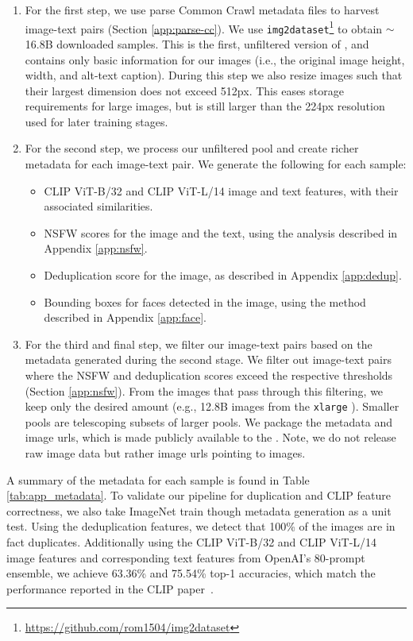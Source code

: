 \begin{enumerate}
    \item For the first step, we use parse Common Crawl metadata files to harvest image-text pairs (Section \ref{app:parse-cc}). We use \texttt{img2dataset}\footnote{\url{https://github.com/rom1504/img2dataset}} to obtain $\sim$16.8B downloaded samples. This is the first, unfiltered version of \pool, and contains only basic information for our images (i.e., the original image height, width, and alt-text caption). During this step we also resize images such that their largest dimension does not exceed 512px.
    This eases storage requirements for large images, but is still larger than the 224px resolution used for later training stages.
    
    \item For the second step, we process our unfiltered pool and create richer metadata for each image-text pair. We generate the following for each sample:
    \begin{itemize}
        \item CLIP ViT-B/32 and CLIP ViT-L/14 image and text features, with their associated similarities.
        \item NSFW scores for the image and the text, using the analysis described in Appendix \ref{app:nsfw}.
        \item Deduplication score for the image, as described in Appendix \ref{app:dedup}.
        \item Bounding boxes for faces detected in the image, using the method described in Appendix \ref{app:face}.
    \end{itemize}

    \item For the third and final step, we filter our image-text pairs based on the metadata generated during the second stage. We filter out image-text pairs where the NSFW and deduplication scores exceed the respective thresholds (Section \ref{app:nsfw}). From the images that pass through this filtering, we keep only the desired amount (e.g., 12.8B images from the {\small \texttt{xlarge}} \pool).
    Smaller pools are telescoping subsets of larger pools.
    We package the metadata and image urls, which is made publicly available to the \users.
    Note, we do not release raw image data but rather image urls pointing to images.
\end{enumerate}

A summary of the metadata for each sample is found in Table \ref{tab:app_metadata}. 
To validate our pipeline for duplication and CLIP feature correctness, we also take ImageNet train though metadata generation as a unit test. Using the deduplication features, we detect that 100\% of the images are in fact duplicates. Additionally using the CLIP ViT-B/32 and CLIP ViT-L/14 image features and corresponding text features from OpenAI's 80-prompt ensemble, we achieve 63.36\% and 75.54\% top-1 accuracies, which match the performance reported in the CLIP paper~\cite{radford2021learning}.

